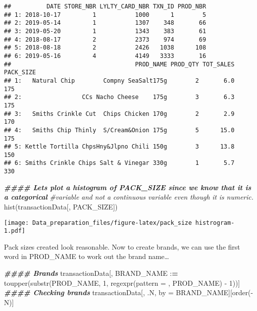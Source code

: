 \documentclass[
]{article}
\newenvironment{Shaded}{\begin{snugshade}}{\end{snugshade}}
\newcommand{\AttributeTok}[1]{\textcolor[rgb]{0.77,0.63,0.00}{#1}}
\newcommand{\CommentTok}[1]{\textcolor[rgb]{0.56,0.35,0.01}{\textit{#1}}}
\newcommand{\DecValTok}[1]{\textcolor[rgb]{0.00,0.00,0.81}{#1}}
\newcommand{\DocumentationTok}[1]{\textcolor[rgb]{0.56,0.35,0.01}{\textbf{\textit{#1}}}}
\newcommand{\ErrorTok}[1]{\textcolor[rgb]{0.64,0.00,0.00}{\textbf{#1}}}
\newcommand{\FunctionTok}[1]{\textcolor[rgb]{0.00,0.00,0.00}{#1}}
\newcommand{\NormalTok}[1]{#1}
\newcommand{\OtherTok}[1]{\textcolor[rgb]{0.56,0.35,0.01}{#1}}
\newcommand{\SpecialCharTok}[1]{\textcolor[rgb]{0.00,0.00,0.00}{#1}}
\newcommand{\StringTok}[1]{\textcolor[rgb]{0.31,0.60,0.02}{#1}}
\begin{document}
\begin{verbatim}
##          DATE STORE_NBR LYLTY_CARD_NBR TXN_ID PROD_NBR
## 1: 2018-10-17         1           1000      1        5
## 2: 2019-05-14         1           1307    348       66
## 3: 2019-05-20         1           1343    383       61
## 4: 2018-08-17         2           2373    974       69
## 5: 2018-08-18         2           2426   1038      108
## 6: 2019-05-16         4           4149   3333       16
##                                   PROD_NAME PROD_QTY TOT_SALES PACK_SIZE
## 1:   Natural Chip        Compny SeaSalt175g        2       6.0       175
## 2:                 CCs Nacho Cheese    175g        3       6.3       175
## 3:   Smiths Crinkle Cut  Chips Chicken 170g        2       2.9       170
## 4:   Smiths Chip Thinly  S/Cream&Onion 175g        5      15.0       175
## 5: Kettle Tortilla ChpsHny&Jlpno Chili 150g        3      13.8       150
## 6: Smiths Crinkle Chips Salt & Vinegar 330g        1       5.7       330
\end{verbatim}

\begin{Shaded}
\begin{Highlighting}[]
\DocumentationTok{\#\#\#\# Let\textquotesingle{}s plot a histogram of PACK\_SIZE since we know that it is a categorical}
\CommentTok{\#variable and not a continuous variable even though it is numeric.}
\FunctionTok{hist}\NormalTok{(transactionData[, PACK\_SIZE])}
\end{Highlighting}
\end{Shaded}

\texttt{[image: Data\_preparation\_files/figure-latex/pack\_size histrogram-1.pdf]}

Pack sizes created look reasonable. Now to create brands, we can use the
first word in PROD\_NAME to work out the brand name\ldots{}

\begin{Shaded}
\begin{Highlighting}[]
\DocumentationTok{\#\#\#\# Brands}
\NormalTok{transactionData[, BRAND\_NAME }\SpecialCharTok{:}\ErrorTok{=} \FunctionTok{toupper}\NormalTok{(}\FunctionTok{substr}\NormalTok{(PROD\_NAME, }\DecValTok{1}\NormalTok{, }\FunctionTok{regexpr}\NormalTok{(}\AttributeTok{pattern =} \StringTok{\textquotesingle{} \textquotesingle{}}\NormalTok{, PROD\_NAME) }\SpecialCharTok{{-}} \DecValTok{1}\NormalTok{))]}
\DocumentationTok{\#\#\#\# Checking brands}
\NormalTok{transactionData[, .N, by }\OtherTok{=}\NormalTok{ BRAND\_NAME][}\FunctionTok{order}\NormalTok{(}\SpecialCharTok{{-}}\NormalTok{N)]}
\end{Highlighting}
\end{Shaded}
\end{document}
